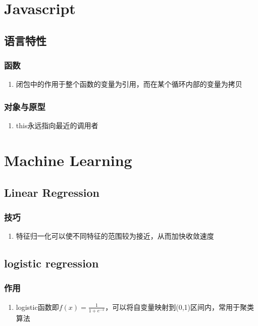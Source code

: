 \documentclass[onecolumn]{article}
\begin{document}
\section{Javascript}
    \subsection{语言特性}
        \subsubsection{函数}
            \noindent
            \begin{enumerate}
                \item 闭包中的作用于整个函数的变量为引用，而在某个循环内部的变量为拷贝
            \end{enumerate}
        \subsubsection{对象与原型}
            \noindent
            \begin{enumerate}
                \item this永远指向最近的调用者
            \end{enumerate}
\newpage
\section{Machine Learning}
    \subsection{Linear Regression}
        \subsubsection{技巧}
            \noindent
            \begin{enumerate}
                \item 特征归一化可以使不同特征的范围较为接近，从而加快收敛速度
            \end{enumerate}
    \subsection{logistic regression}
        \subsubsection{作用}
            \noindent
            \begin{enumerate}
                \item logistic函数即$f(x)=\frac{1}{1+e^{-x}}$，可以将自变量映射到(0,1)区间内，常用于聚类算法
            \end{enumerate}
\end{document}

